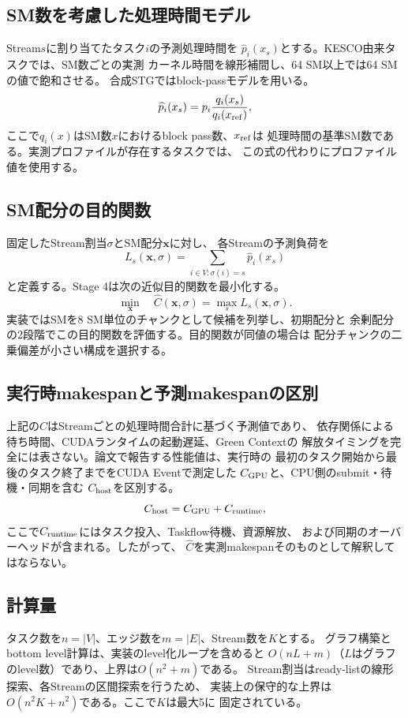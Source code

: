 \subsection{SM数を考慮した処理時間モデル}
Stream$s$に割り当てたタスク$i$の予測処理時間を
$\widehat{p}_i(x_s)$とする。KESCO由来タスクでは、SM数ごとの実測
カーネル時間を線形補間し、64 SM以上では64 SMの値で飽和させる。
合成STGではblock-passモデルを用いる。
\[
 \widehat{p}_i(x_s)=
 p_i\frac{q_i(x_s)}{q_i(x_{\rm ref})},
\]
ここで$q_i(x)$はSM数$x$におけるblock pass数、$x_{\rm ref}$は
処理時間の基準SM数である。実測プロファイルが存在するタスクでは、
この式の代わりにプロファイル値を使用する。

\subsection{SM配分の目的関数}
固定したStream割当$\sigma$とSM配分$\boldsymbol{x}$に対し、
各Streamの予測負荷を
\[
 L_s(\boldsymbol{x},\sigma)
 =\sum_{i\in V:\sigma(i)=s}\widehat{p}_i(x_s)
\]
と定義する。Stage 4は次の近似目的関数を最小化する。
\[
 \min_{\boldsymbol{x}}\quad
 \widehat{C}(\boldsymbol{x},\sigma)
 =\max_{s}L_s(\boldsymbol{x},\sigma).
\]
実装ではSMを8 SM単位のチャンクとして候補を列挙し、初期配分と
余剰配分の2段階でこの目的関数を評価する。目的関数が同値の場合は
配分チャンクの二乗偏差が小さい構成を選択する。

\subsection{実行時makespanと予測makespanの区別}
上記の$\widehat{C}$はStreamごとの処理時間合計に基づく予測値であり、
依存関係による待ち時間、CUDAランタイムの起動遅延、Green Contextの
解放タイミングを完全には表さない。論文で報告する性能値は、実行時の
最初のタスク開始から最後のタスク終了までをCUDA Eventで測定した
$C_{\rm GPU}$と、CPU側のsubmit・待機・同期を含む
$C_{\rm host}$を区別する。
\[
 C_{\rm host}
 = C_{\rm GPU}+C_{\rm runtime},
\]
ここで$C_{\rm runtime}$にはタスク投入、Taskflow待機、資源解放、
および同期のオーバーヘッドが含まれる。したがって、
$\widehat{C}$を実測makespanそのものとして解釈してはならない。

\subsection{計算量}
タスク数を$n=|V|$、エッジ数を$m=|E|$、Stream数を$K$とする。
グラフ構築とbottom level計算は、実装のlevel化ループを含めると
$O(nL+m)$（$L$はグラフのlevel数）であり、上界は$O(n^2+m)$である。
Stream割当はready-listの線形探索、各Streamの区間探索を行うため、
実装上の保守的な上界は$O(n^2K+n^2)$である。ここで$K$は最大5に
固定されている。

